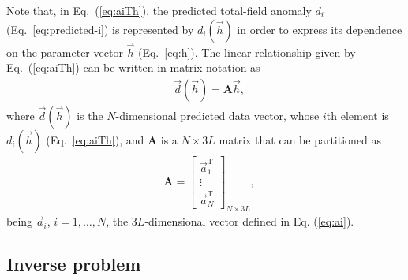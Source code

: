\documentclass[journal abbreviation, npg]{copernicus}
\providecommand{\DIFadd}[1]{{\protect\color{blue}\uwave{#1}}} %
\providecommand{\DIFaddbegin}{} %
\providecommand{\DIFaddend}{} %
\begin{document}
Note that, in Eq.~(\ref{eq:aiTh}), the predicted total-field anomaly $d_{i}$
(Eq.~\ref{eq:predicted-i}) is represented by $d_{i}(\vec{h})$ in order to
express its dependence on the parameter vector $\vec{h}$ (Eq.~\ref{eq:h}).
The linear relationship given by Eq.~(\ref{eq:aiTh}) can be written in matrix
notation as
\begin{align}
 &
\vec{d}(\vec{h}) = \mathbf{A}  \vec{h} ,
\label{eq:predicted-data-vector}
\end{align}
where $\vec{d}(\vec{h})$ is the $N$-dimensional predicted data vector, whose
$i$th element is $d_{i}(\vec{h})$ (Eq.~\ref{eq:aiTh}), and $\mathbf{A}$ is
a $N \times 3L$ matrix \DIFaddbegin \DIFadd{$\left(N > 3L\right)$ }\DIFaddend that can be partitioned as
\begin{align}
 &
\mathbf{A} =
\left[
\begin{array}{c}
\vec{a}_{1}^{\mathrm{T}} \\
\vdots \\
\vec{a}_{N}^{\mathrm{T}}
\end{array}
\right]_{N \times 3L} ,
\label{eq:sensibility-matrix}
\end{align}
being $\vec{a}_{i}$, $i = 1, \ldots, N$, the $3L$-dimensional vector
defined in Eq. (\ref{eq:ai}).




\subsection{Inverse problem}
\end{document}

